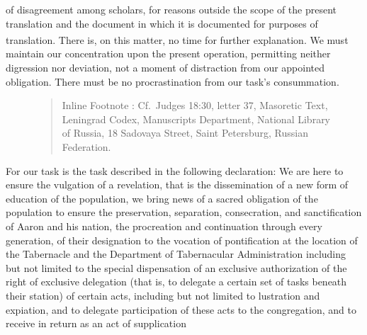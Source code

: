 {{{{{                        of disagreement among scholars, for reasons outside the scope of
                        the present translation and the document in which it is documented
                        for purposes of translation.
                        There is, on this matter, no time for further explanation.\textsuperscript{}
					   We must maintain our concentration upon the present operation,
                        permitting neither digression nor deviation, not a moment of
                        distraction from our appointed obligation.
                        There must be no procrastination from our task's consummation.
						\begin{figure}
							\begin{quote}
							\vspace{-0.5\baselineskip}
							\scriptsize\RaggedRight
						Inline Footnote :
						Cf.\ Judges 18:30, letter 37,
						Masoretic Text,
						Leningrad Codex,
						Manuscripts Department,
						National Library of Russia,
						18 Sadovaya Street,
						Saint Petersburg,
						Russian Federation.
						\vspace{-0.5\baselineskip}
						\end{quote}
						\end{figure}
                        For our task is the task described in the following declaration:
                        We are here to ensure the vulgation of a revelation, that is
                        the dissemination of a new form of education of the population,
                        we bring news of a sacred obligation of the population to ensure
                        the preservation, separation, consecration, and sanctification of
                        Aaron and his nation, the procreation and continuation through
                        every generation, of their designation to the vocation of pontification
                        at the location of the Tabernacle and the Department of Tabernacular Administration
                        including but not limited to the special dispensation of an exclusive
                        authorization of the right of exclusive delegation (that is, to delegate
                        a certain set of tasks beneath their station) of certain acts,
                        including but not limited to lustration and expiation,
                        and to delegate participation of these acts to the congregation,
                        and to receive in return as an act of supplication
}}}}}
